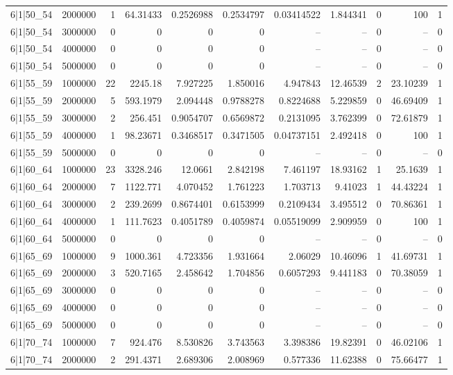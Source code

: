 \begin{tabular}{lrrrrrrrrrr}
6|1|50\_54 & 2000000 & 1 & 64.31433 & 0.2526988 & 0.2534797 & 0.03414522 & 1.844341 & 0 & 100 & 1 \\
6|1|50\_54 & 3000000 & 0 & 0 & 0 & 0 & -- & -- & 0 & -- & 0 \\
6|1|50\_54 & 4000000 & 0 & 0 & 0 & 0 & -- & -- & 0 & -- & 0 \\
6|1|50\_54 & 5000000 & 0 & 0 & 0 & 0 & -- & -- & 0 & -- & 0 \\
6|1|55\_59 & 1000000 & 22 & 2245.18 & 7.927225 & 1.850016 & 4.947843 & 12.46539 & 2 & 23.10239 & 1 \\
6|1|55\_59 & 2000000 & 5 & 593.1979 & 2.094448 & 0.9788278 & 0.8224688 & 5.229859 & 0 & 46.69409 & 1 \\
6|1|55\_59 & 3000000 & 2 & 256.451 & 0.9054707 & 0.6569872 & 0.2131095 & 3.762399 & 0 & 72.61879 & 1 \\
6|1|55\_59 & 4000000 & 1 & 98.23671 & 0.3468517 & 0.3471505 & 0.04737151 & 2.492418 & 0 & 100 & 1 \\
6|1|55\_59 & 5000000 & 0 & 0 & 0 & 0 & -- & -- & 0 & -- & 0 \\
6|1|60\_64 & 1000000 & 23 & 3328.246 & 12.0661 & 2.842198 & 7.461197 & 18.93162 & 1 & 25.1639 & 1 \\
6|1|60\_64 & 2000000 & 7 & 1122.771 & 4.070452 & 1.761223 & 1.703713 & 9.41023 & 1 & 44.43224 & 1 \\
6|1|60\_64 & 3000000 & 2 & 239.2699 & 0.8674401 & 0.6153999 & 0.2109434 & 3.495512 & 0 & 70.86361 & 1 \\
6|1|60\_64 & 4000000 & 1 & 111.7623 & 0.4051789 & 0.4059874 & 0.05519099 & 2.909959 & 0 & 100 & 1 \\
6|1|60\_64 & 5000000 & 0 & 0 & 0 & 0 & -- & -- & 0 & -- & 0 \\
6|1|65\_69 & 1000000 & 9 & 1000.361 & 4.723356 & 1.931664 & 2.06029 & 10.46096 & 1 & 41.69731 & 1 \\
6|1|65\_69 & 2000000 & 3 & 520.7165 & 2.458642 & 1.704856 & 0.6057293 & 9.441183 & 0 & 70.38059 & 1 \\
6|1|65\_69 & 3000000 & 0 & 0 & 0 & 0 & -- & -- & 0 & -- & 0 \\
6|1|65\_69 & 4000000 & 0 & 0 & 0 & 0 & -- & -- & 0 & -- & 0 \\
6|1|65\_69 & 5000000 & 0 & 0 & 0 & 0 & -- & -- & 0 & -- & 0 \\
6|1|70\_74 & 1000000 & 7 & 924.476 & 8.530826 & 3.743563 & 3.398386 & 19.82391 & 0 & 46.02106 & 1 \\
6|1|70\_74 & 2000000 & 2 & 291.4371 & 2.689306 & 2.008969 & 0.577336 & 11.62388 & 0 & 75.66477 & 1 \\

\end{tabular}
